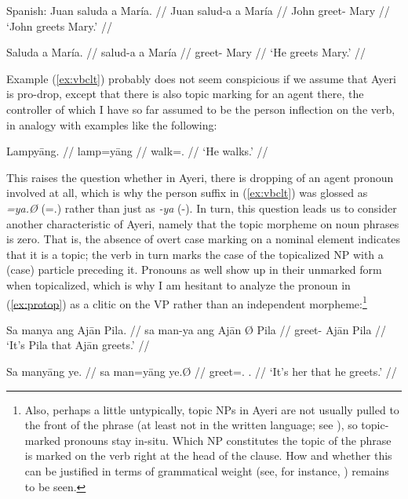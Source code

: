 \pex%
Spanish:
\a\label{ex:vbagrspann}\begingl
	\gla Juan saluda a María. //
	\glb Juan salud-a a María //
	\glc John greet-\Tsg{} \Acc{} Mary //
	\glft `John greets Mary.' //
\endgl

\a\label{ex:vbagrspapr}\begingl
	\gla Saluda a María. //
	\glb salud-a a María //
	\glc greet-\Tsg{} \Acc{} Mary //
	\glft `He greets Mary.' //
\endgl

\xe

Example (\ref{ex:vbclt}) probably does not seem conspicious if we assume that
Ayeri is pro-drop, except that there is also topic marking for an agent there,
the controller of which I have so far assumed to be the person inflection on
the verb, in analogy with examples like the following:

\ex\label{ex:lampyaang} %
\begingl
	\gla Lampyāng. //
	\glb lamp=yāng //
	\glc walk=\TsgM{}.\Aarg{} //
	\glft `He walks.' //
\endgl\xe

This raises the question whether in Ayeri, there is dropping of an agent
pronoun involved at all, which is why the person suffix in (\ref{ex:vbclt}) was
glossed as \emph{=ya.Ø} (\mbox{=\TsgM{}.\Top{}}) rather than just as \emph{-ya}
(-\TsgM{}). In turn, this question leads us to consider another characteristic
of Ayeri, namely that the topic morpheme on noun phrases is zero. That is, the
absence of overt case marking on a nominal element indicates that it is a
topic; the verb in turn marks the case of the topicalized NP with a (case)
particle preceding it. Pronouns as well show up in their unmarked form when
topicalized, which is why I am hesitant to analyze the pronoun in
(\ref{ex:protop}) as a clitic on the VP rather than an independent
morpheme:\footnote{Also, perhaps a little untypically, topic NPs in Ayeri are
not usually pulled to the front of the phrase (at least not in the written
language; see \cite[120--122]{lehmann2015}), so topic-marked pronouns stay 
in-situ. Which NP constitutes the topic of the phrase is marked on the verb 
right at the head of the clause. How and whether this can be justified in 
terms of grammatical weight (see, for instance, \cite[95--98]{wasow1997}) 
remains to be seen.}

\pex %
\a\label{ex:fullsntc}\begingl
	\gla Sa manya ang Ajān {} Pila. //
	\glb sa man-ya ang ​Ajān Ø ​Pila //
	\glc \PatT{} greet-\TsgM{} \Aarg{} ​Ajān \Top{} ​Pila //
	\glft `It's Pila that Ajān greets.' //
\endgl

\a\label{ex:protop}\begingl
	\gla Sa manyāng ye. //
	\glb sa man=yāng ye.Ø //
	\glc \PatT{} greet=\TsgM{}.\Aarg{} \TsgF{}.\Top{} //
	\glft `It's her that he greets.' //
\endgl

